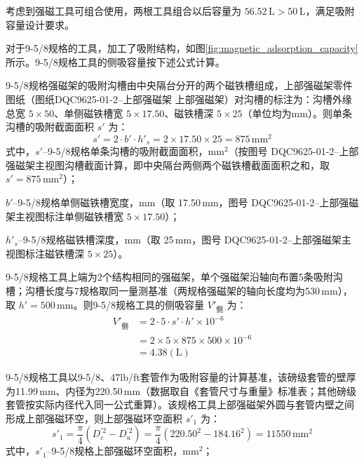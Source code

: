 考虑到强磁工具可组合使用，两根工具组合以后容量为 $56.52\,\text{L} > 50\,\text{L}$，满足吸附容量设计要求。

对于9-5/8\inch 规格的工具，加工了吸附结构，如图\ref{fig:magnetic_adsorption_capacity}所示。9-5/8\inch 规格工具的侧吸容量按下述公式计算。

9-5/8\inch 规格强磁架的吸附沟槽由中央隔台分开的两个磁铁槽组成，上部强磁架零件图纸（图纸DQC9625-01-2--上部强磁架 上部强磁架）对沟槽的标注为：沟槽外缘总宽 $5\times 50$、单侧磁铁槽宽 $5\times 17.50$、磁铁槽深 $5\times 25$（单位均为mm）。则单条沟槽的吸附截面面积 $s'$ 为：
\begin{equation}
    s' = 2 \cdot b' \cdot h'_{s} = 2 \times 17.50 \times 25 = 875\,\text{mm}^2
    \label{eq:mag_tool_side_section_9625}
\end{equation}
式中，$s'$--9-5/8\inch 规格单条沟槽的吸附截面面积，mm$^2$（按图号 DQC9625-01-2--上部强磁架主视图沟槽截面计算，即中央隔台两侧两个磁铁槽截面面积之和，取 $s' = 875\,\text{mm}^2$）；

$b'$--9-5/8\inch 规格单侧磁铁槽宽度，mm（取 17.50\,mm，图号 DQC9625-01-2--上部强磁架主视图标注单侧磁铁槽宽 $5\times 17.50$）；

$h'_{s}$--9-5/8\inch 规格磁铁槽深度，mm（取 25\,mm，图号 DQC9625-01-2--上部强磁架主视图标注磁铁槽深 $5\times 25$）。

9-5/8\inch 规格工具上端为2个结构相同的强磁架，单个强磁架沿轴向布置5条吸附沟槽；沟槽长度与7\inch 规格取同一量测基准（两规格强磁架的轴向长度均为530\,mm），取 $h' = 500\,\text{mm}$。则9-5/8\inch 规格工具的侧吸容量 $V'_{\text{侧}}$ 为：
\begin{equation}
	\begin{aligned}
    V'_{\text{侧}} &= 2 \cdot 5 \cdot s' \cdot h' \times 10^{-6} \\
                  &= 2 \times 5 \times 875 \times 500 \times 10^{-6} \\
                  &= 4.38(\text{L})
	\end{aligned}
    \label{eq:mag_tool_side_capacity_9625}
\end{equation}

9-5/8\inch 规格工具以9-5/8\inch、47lb/ft套管作为吸附容量的计算基准，该磅级套管的壁厚为11.99\,mm、内径为220.50\,mm（数据取自《套管尺寸与重量》标准表；其他磅级套管按实际内径代入同一公式重算）。该规格工具上部强磁架外圆与套管内壁之间形成上部强磁环空，则上部强磁环空面积 $s'_1$ 为：
\begin{equation}
    s'_1 = \frac{\pi}{4}\left(D_c^{\prime 2} - D_u^{\prime 2}\right) = \frac{\pi}{4}\left(220.50^2 - 184.16^2\right) = 11550\,\text{mm}^2
    \label{eq:mag_tool_annulus_9625}
\end{equation}
式中，$s'_1$--9-5/8\inch 规格上部强磁环空面积，mm$^2$；

